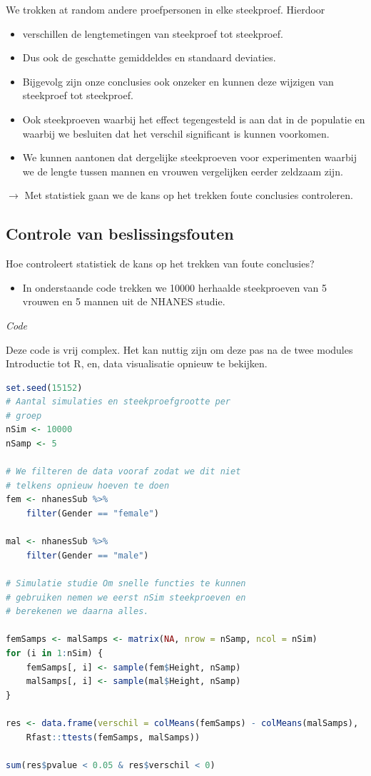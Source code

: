 \documentclass[
  12pt,dutch,coursenotes]{book}
\providecommand{\tightlist}{%
  \setlength{\itemsep}{0pt}\setlength{\parskip}{0pt}}
\begin{document}
We trokken at random andere proefpersonen in elke steekproef. Hierdoor

\begin{itemize}
\item
  verschillen de lengtemetingen van steekproef tot steekproef.
\item
  Dus ook de geschatte gemiddeldes en standaard deviaties.
\item
  Bijgevolg zijn onze conclusies ook onzeker en kunnen deze wijzigen van steekproef tot steekproef.
\item
  Ook steekproeven waarbij het effect tegengesteld is aan dat in de populatie en waarbij we besluiten dat het verschil significant is kunnen voorkomen.
\item
  We kunnen aantonen dat dergelijke steekproeven voor experimenten waarbij we de lengte tussen mannen en vrouwen vergelijken eerder zeldzaam zijn.
\end{itemize}

\(\rightarrow\) Met statistiek gaan we de kans op het trekken foute conclusies controleren.

\hypertarget{controle-van-beslissingsfouten}{%
\subsection{Controle van beslissingsfouten}\label{controle-van-beslissingsfouten}}

Hoe controleert statistiek de kans op het trekken van foute conclusies?

\begin{itemize}
\tightlist
\item
  In onderstaande code trekken we 10000 herhaalde steekproeven van 5 vrouwen en 5 mannen uit de NHANES studie.
\end{itemize}

\emph{Code}

Deze code is vrij complex. Het kan nuttig zijn om deze pas na de twee modules Introductie tot R, en, data visualisatie opnieuw te bekijken.

\begin{lstlisting}[language=R]
set.seed(15152)
# Aantal simulaties en steekproefgrootte per
# groep
nSim <- 10000
nSamp <- 5

# We filteren de data vooraf zodat we dit niet
# telkens opnieuw hoeven te doen
fem <- nhanesSub %>%
    filter(Gender == "female")

mal <- nhanesSub %>%
    filter(Gender == "male")

# Simulatie studie Om snelle functies te kunnen
# gebruiken nemen we eerst nSim steekproeven en
# berekenen we daarna alles.

femSamps <- malSamps <- matrix(NA, nrow = nSamp, ncol = nSim)
for (i in 1:nSim) {
    femSamps[, i] <- sample(fem$Height, nSamp)
    malSamps[, i] <- sample(mal$Height, nSamp)
}

res <- data.frame(verschil = colMeans(femSamps) - colMeans(malSamps),
    Rfast::ttests(femSamps, malSamps))

sum(res$pvalue < 0.05 & res$verschil < 0)
\end{lstlisting}
\end{document}
